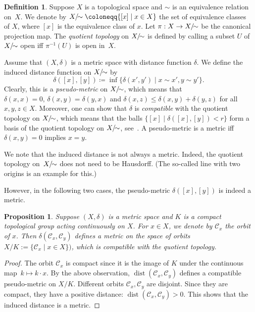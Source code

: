 \documentclass[10pt,a4paper]{article}
\newtheorem{proposition}[theorem]{Proposition}
\theoremstyle{definition}
\newtheorem{definition}[theorem]{Definition}
\DeclareMathOperator{\dist}{dist}
\newcommand{\KK}{\ensuremath{\mathcal{C}}}
\newcommand{\Xquot}{X/\hspace{-1ex}\sim}
\numberwithin{equation}{section}
\begin{document}
\begin{definition}
Suppose $X$ is a topological space and $\sim$ is an equivalence relation on~$X$.
We denote by $\Xquot\coloneqq\{[x]\mid x\in X\}$ the set of equivalence classes of $X$,
where $[x]$ is the equivalence class of $x$. Let $\pi:X\rightarrow \Xquot$ be the canonical projection map.
The \textit{quotient topology} on $\Xquot$ is defined by calling
a subset $U$ of $\Xquot$ open iff $\pi^{-1}(U)$ is open in~$X$.
\end{definition}

Assume that $(X,\delta)$ is a metric space with distance function $\delta$.
We define the induced distance function on $\Xquot$ by
\[
\delta([x],[y]) \coloneqq \inf\{\delta (x',y')\mid x\sim x', y\sim y'\} .
\]
Clearly, this is a \textit{pseudo-metric} on $\Xquot$, which means that
$\delta(x,x)=0, \, \delta(x,y)=\delta(y,x)$
and $\delta(x,z)\leq\delta(x,y)+\delta(y,z)$ for all $x,y,z\in X$.
Moreover, one can show that $\delta$ is \textit{compatible}
with the quotient topology on $\Xquot$,
which means that the balls
$\{ [x] \mid \delta([x],[y]) < r \}$
form a basis of the quotient topology on $\Xquot$,
see~\cite[Theorem~4]{himmelberg}.
A pseudo-metric is a metric iff $\delta(x,y)=0$ implies $x=y$.

We note that the induced distance is not always a metric.
Indeed, the quotient topology on~$\Xquot$ does not need to be Hausdorff.
(The so-called line with two origins is an example for this.)

However, in the following two cases,
the pseudo-metric $\delta([x],[y])$ is indeed a metric.

\begin{proposition}
\label{prop:compact-quot}
Suppose $(X,\delta)$ is a metric space and $K$ is a compact topological group
acting continuously on $X$. %
For $x\in X$, we denote by $\KK_x$ the orbit of $x$.
Then $\delta(\KK_x, \KK_y)$ defines a metric on the space of orbits
$X/K := \{ \KK_x \mid x\in X \})$,
which is compatible with the quotient topology.
\end{proposition}

\begin{proof}
The orbit $\KK_x$ is compact since it is the image of $K$ under the continuous map~$k\mapsto k\cdot x$.
By the above observation, $\dist(\KK_x,\KK_y)$ defines a compatible pseudo-metric on $X/K$.
Different orbits $\KK_x,\KK_y$ are disjoint. Since they are compact, they have a positive distance:
$\dist(\KK_x,\KK_y)>0$.
This shows that the induced distance is a metric.
\end{proof}
\end{document}
